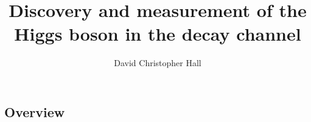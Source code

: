 \documentclass[hyper,allcolors=blue]{mythesis}  %
\title{Discovery and measurement of the Higgs boson in the \WW decay channel}
\author{David Christopher Hall}
\begin{document}
\begin{frontmatter}
  
\end{frontmatter}

\begin{mainmatter}
  \clearpage
  
  \chapter*{Overview}
    \label{chap:intro}
    

  
  
  
  
  
  
  
  
  
  
\end{mainmatter}

\begin{singlespacing}
  \cleardoublepage
  
\end{singlespacing}
\end{document}
